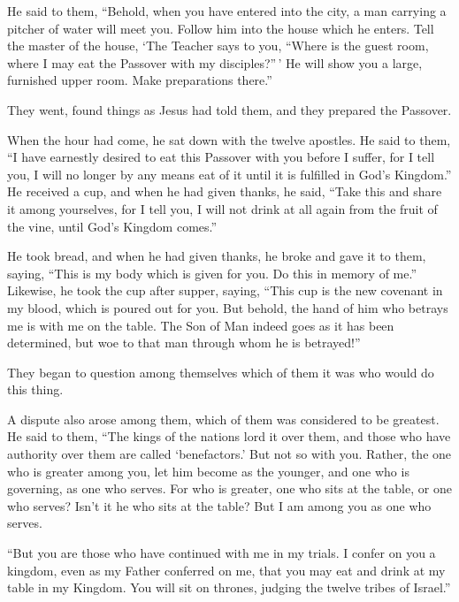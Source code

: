  He said to them, ``Behold, when you have entered into
the city, a man carrying a pitcher of water will meet you. Follow him
into the house which he enters.  Tell the master of the
house, `The Teacher says to you, ``Where is the guest room, where I may
eat the Passover with my disciples?''\,'  He will show
you a large, furnished upper room. Make preparations there.''

 They went, found things as Jesus had told them, and they
prepared the Passover.

 When the hour had come, he sat down with the twelve
apostles.  He said to them, ``I have earnestly desired to
eat this Passover with you before I suffer,  for I tell
you, I will no longer by any means eat of it until it is fulfilled in
God's Kingdom.''  He received a cup, and when he had
given thanks, he said, ``Take this and share it among yourselves,
 for I tell you, I will not drink at all again from the
fruit of the vine, until God's Kingdom comes.''

 He took bread, and when he had given thanks, he broke
and gave it to them, saying, ``This is my body which is given for you.
Do this in memory of me.''  Likewise, he took the cup
after supper, saying, ``This cup is the new covenant in my blood, which
is poured out for you.  But behold, the hand of him who
betrays me is with me on the table.  The Son of Man
indeed goes as it has been determined, but woe to that man through whom
he is betrayed!''

 They began to question among themselves which of them it
was who would do this thing.

 A dispute also arose among them, which of them was
considered to be greatest.  He said to them, ``The kings
of the nations lord it over them, and those who have authority over them
are called `benefactors.'  But not so with you. Rather,
the one who is greater among you, let him become as the younger, and one
who is governing, as one who serves.  For who is greater,
one who sits at the table, or one who serves? Isn't it he who sits at
the table? But I am among you as one who serves.

 ``But you are those who have continued with me in my
trials.  I confer on you a kingdom, even as my Father
conferred on me,  that you may eat and drink at my table
in my Kingdom. You will sit on thrones, judging the twelve tribes of
Israel.''

